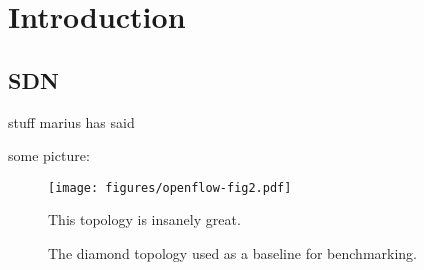\chapter{Introduction}

\section{SDN}

stuff marius has said \cite{koponen:onix}

some picture:

\begin{figure}
    \begin{center}
        \texttt{[image: figures/openflow-fig2.pdf]}
        \caption{The diamond topology used as a baseline for benchmarking.} This topology is insanely great.
    \end{center}
\end{figure}

